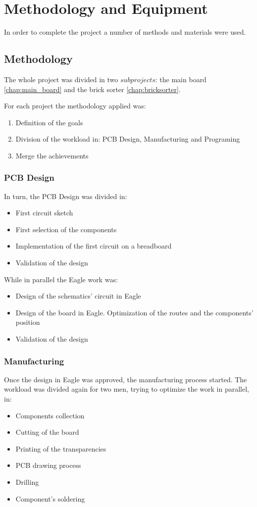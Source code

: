 \chapter{Methodology and Equipment}
\label{chap:methodology}

In order to complete the project a number of methods and materials were used.
\section{Methodology}
\label{sec:methodology}

The whole project was divided in two $subprojects$: the main board \ref{chap:main_board} and the brick sorter \ref{chap:bricksorter}.

For each project the methodology applied was:
\begin{enumerate}
\item Definition of the goals
\item Division of the workload in: PCB Design, Manufacturing and Programing
\item Merge the achievements
\end{enumerate}

\subsection{PCB Design}
In turn, the PCB Design was divided in:
\begin{itemize}
\item First circuit sketch
\item First selection of the components
\item Implementation of the first circuit on a breadboard
\item Validation of the design
\end{itemize}

While in parallel the Eagle work was:
\begin{itemize}
\item Design of the schematics' circuit in Eagle
\item Design of the board in Eagle. Optimization of the routes and the components' position
\item Validation of the design
\end{itemize}

\subsection{Manufacturing}
Once the design in Eagle was approved, the manufacturing process started. The workload was divided again for two men, trying to optimize the work in parallel, in:
\begin{itemize}
\item Components collection
\item Cutting of the board
\item Printing of the transparencies
\item PCB drawing process
\item Drilling
\item Component's soldering
\end{itemize}


